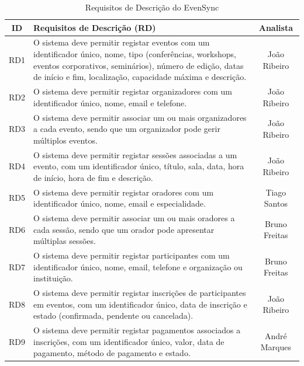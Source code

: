 \documentclass[runningheads]{llncs}
\begin{document}
                \begin{table}[H]
                \centering
                \begin{tabular}{|c|p{}|c|}
                \hline
                \textbf{ID} & \textbf{Requisitos de Descrição (RD)} & \textbf{Analista} \\ \hline
                RD1 & O sistema deve permitir registar eventos com um identificador único, nome, tipo (conferências, workshops, eventos corporativos, seminários), número de edição, datas de início e fim, localização, capacidade máxima e descrição. & João Ribeiro \\ \hline
                RD2 & O sistema deve permitir registar organizadores com um identificador único, nome, email e telefone. & João Ribeiro \\ \hline
                RD3 & O sistema deve permitir associar um ou mais organizadores a cada evento, sendo que um organizador pode gerir múltiplos eventos. & João Ribeiro \\ \hline
                RD4 & O sistema deve permitir registar sessões associadas a um evento, com um identificador único, título, sala, data, hora de início, hora de fim e descrição. & João Ribeiro \\ \hline
                RD5 & O sistema deve permitir registar oradores com um identificador único, nome, email e especialidade. & Tiago Santos \\ \hline
                RD6 & O sistema deve permitir associar um ou mais oradores a cada sessão, sendo que um orador pode apresentar múltiplas sessões. & Bruno Freitas \\ \hline
                RD7 & O sistema deve permitir registar participantes com um identificador único, nome, email, telefone e organização ou instituição. & Bruno Freitas \\ \hline
                RD8 & O sistema deve permitir registar inscrições de participantes em eventos, com um identificador único, data de inscrição e estado (confirmada, pendente ou cancelada). & João Ribeiro \\ \hline
                RD9 & O sistema deve permitir registar pagamentos associados a inscrições, com um identificador único, valor, data de pagamento, método de pagamento e estado. & André Marques \\ \hline
                \end{tabular}
                \vspace{0.2cm}
                \caption{Requisitos de Descrição do EvenSync} \label{tab:requisitos_rd}
                \end{table}
\end{document}
